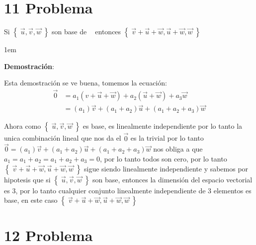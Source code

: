\documentclass[12pt, fleqn]{article}                             %
\newenvironment{SmallIndentation}[1][0.75em]                    %
        {\begin{adjustwidth}{#1}{}\begin{footnotesize}}             %
        {\end{footnotesize}\end{adjustwidth}}                       %
\theoremstyle{break}                                            %
\DeclareMathOperator \GenericField {\mathbb{F}}                 %
\DeclareMathOperator \VectorSet    {\mathbb{V}}                 %
\DeclareMathOperator \VectorSpace  {\VectorSet_{\GenericField}} %
\newcommand{\Set}[1]    {\left\{ \; #1 \; \right\}}             %
\begin{document}
\clearpage
\section{11 Problema}

    Si $\Set{\vec u, \vec v, \vec w}$ son base de $\VectorSpace$ entonces 
    $\Set{\vec v + \vec u + \vec w, \vec u + \vec w, \vec w}$

    \begin{SmallIndentation}[1em]
        \textbf{Demostración}:
    
        Esta demostración se ve buena, tomemos
        la ecuación:
        \begin{align*}
            \vec 0 
                &= a_1 (v + \vec u + \vec w) + a_2(\vec u + \vec w) + a_3 \vec w        \\
                &= (a_1)\vec v + (a_1 + a_2)\vec u  + (a_1 + a_2 + a_3)\vec w 
        \end{align*}

        Ahora como $\Set{\vec u, \vec v, \vec w}$ es base, es linealmente independiente
        por lo tanto la unica combinación lineal que nos da el $\vec 0$ es la trivial
        por lo tanto $\vec 0 = (a_1)\vec v + (a_1 + a_2)\vec u  + (a_1 + a_2 + a_3)\vec w$
        nos obliga a que $a_1 = a_1 + a_2 = a_1 + a_2 + a_3 = 0$, por lo tanto
        todos son cero, por lo tanto $\Set{\vec v + \vec u + \vec w, \vec u + \vec w, \vec w}$
        sigue siendo linealmente independiente y sabemos por hipotesis que si 
        $\Set{\vec u, \vec v, \vec w}$ son base, entonces la dimensión del espacio vectorial
        es 3, por lo tanto cualquier conjunto linealmente independiente de 3 elementos
        es base, en este caso $\Set{\vec v + \vec u + \vec w, \vec u + \vec w, \vec w}$

    \end{SmallIndentation}
                         

\vspace{1em}
\section{12 Problema}
\end{document}
